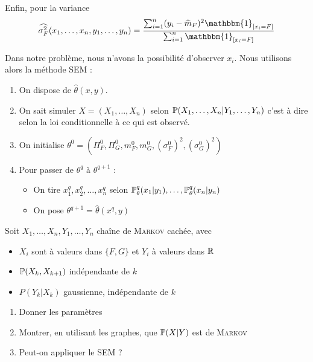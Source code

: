 Enfin, pour la variance
\[ \widehat{\sigma^2_F}(x_1,\ldots,x_n,y_1,\ldots,y_n) = \frac{\sum_{i=1}^{n} (y_i-\widehat{m}_F)^2 \mathbbm{1}_{[x_i=F]}}{\sum_{i=1}^n \mathbbm{1}_{[x_i = F]}} \]

Dans notre problème, nous n'avons la possibilité d'observer $x_i$. Nous utilisons alors la méthode SEM :
\begin{enumerate}
\item On dispose de $\widehat{\theta}(x,y)$.
\item On sait simuler $X=(X_1,\ldots,X_n)$ selon $\P(X_1,\ldots,X_n\vert Y_1, \ldots, Y_n)$ %
  c'est à dire selon la loi conditionnelle à ce qui est observé.
\item On initialise $\theta^0 = (\Pi_F^0, \Pi_G^0, m_F^0, m_G^0, (\sigma^0_F)^2, (\sigma_G^0)^2)$
\item Pour passer de $\theta^q$ à $\theta^{q+1}$ :
  \begin{itemize}
    \item On tire $x_1^q, x_2^q, \ldots, x_n^q$ selon $\P_\theta^q(x_1 \vert y_1), \ldots, \P_\theta^q(x_n \vert y_n)$
    \item On pose $\theta^{q+1} = \widehat{\theta}(x^q, y)$
  \end{itemize}
\end{enumerate}

\begin{exo}
  Soit $X_1,\ldots,X_n,Y_1,\ldots,Y_n$ chaîne de \textsc{Markov} cachée, avec 
  \begin{itemize}
    \item $X_i$ sont à valeurs dans $\{F,G\}$ et $Y_i$ à valeurs dans $\R$
    \item $\P(X_k,X_{k+1})$ indépendante de $k$
    \item $P(Y_k \vert X_k)$ gaussienne, indépendante de $k$
  \end{itemize}
  \begin{enumerate}
      \item Donner les paramètres
      \item Montrer, en utilisant les graphes, que $\P(X\vert Y)$ est de \textsc{Markov}
      \item Peut-on appliquer le SEM ?
  \end{enumerate}
\end{exo}

